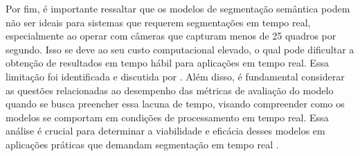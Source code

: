 Por fim, é importante ressaltar que os modelos de segmentação semântica podem não ser ideais para sistemas que requerem segmentações em tempo real, especialmente ao operar com câmeras que capturam menos de 25 quadros por segundo. Isso se deve ao seu custo computacional elevado, o qual pode dificultar a obtenção de resultados em tempo hábil para aplicações em tempo real. Essa limitação foi identificada e discutida por \cite{Minaee2021}. Além disso, é fundamental considerar as questões relacionadas ao desempenho das métricas de avaliação do modelo quando se busca preencher essa lacuna de tempo, visando compreender como os modelos se comportam em condições de processamento em tempo real. Essa análise é crucial para determinar a viabilidade e eficácia desses modelos em aplicações práticas que demandam segmentação em tempo real \citep{badrinarayanan2017segnet}.